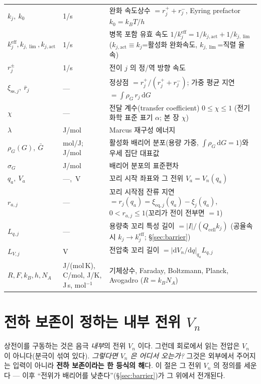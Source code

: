 \documentclass[11pt,a4paper]{article}
\newcommand{\dd}{\mathrm{d}}
\newcommand{\eff}{\mathrm{eff}}
\newcommand{\eq}{\mathrm{eq}}
\newcommand{\cell}{\mathrm{cell}}
\newcommand{\sstat}{\mathrm{ss}}
\begin{document}
\begin{longtable}{p{} p{} p{}}
$k_j,\ k_0$ & 1/s & 완화 속도상수 $=r_j^++r_j^-$, Eyring prefactor $k_0=k_BT/h$ \\
$k_j^{\eff},k_{j,\lim},k_{j,\mathrm{act}}$ & 1/s & 병목 포함 유효 속도 $1/k_j^{\eff}=1/k_{j,\mathrm{act}}+1/k_{j,\lim}$ ($k_{j,\mathrm{act}}\!\equiv\!k_j$=활성화 완화속도, $k_{j,\lim}$=직렬 율속) \\
$r_j^\pm$ & 1/s & 전이 $j$ 의 정/역 방향 속도 \\
$\xi_{\sstat,j},\ \bar r_j$ & --- & 정상점 $=r_j^+/(r_j^++r_j^-)$; 가중 평균 지연 $=\int\rho_G\,r_j\,\dd G$ \\
$\chi$ & --- & 전달 계수(transfer coefficient) $0\le\chi\le1$ (전기화학 표준 표기 $\alpha$; 본 장 $\chi$) \\
$\lambda$ & J/mol & Marcus 재구성 에너지 \\
$\rho_G(G),\ \bar G$ & mol/J;\,J/mol & 활성화 배리어 분포(용량 가중, $\int\rho_G\,\dd G=1$)와 우세 집단 대표값 \\
$\sigma_G$ & J/mol & 배리어 분포의 표준편차 \\
$q_a,\ V_a$ & ---,\ V & 꼬리 시작 좌표와 그 전위 $V_a=V_n(q_a)$ \\
$r_{a,j}$ & --- & 꼬리 시작점 잔류 지연 $=r_j(q_a)=\xi_{\eq,j}(q_a)-\xi_j(q_a)$, $0<r_{a,j}\le1$(꼬리가 전이 전부면 $=1$) \\
$L_{q,j}$ & --- & 용량축 꼬리 특성 길이 $=|I|/(Q_\cell k_j)$ (공율속 시 $k_j\!\to\!k_j^{\eff}$; \S\ref{sec:barrier}) \\
$L_{V,j}$ & V & 전압축 꼬리 길이 $=|\dd V_n/\dd q|_{q_a}L_{q,j}$ \\
$R,F,k_B,h,N_A$ & {\footnotesize J/(mol\,K), C/mol, J/K, J\,s, mol$^{-1}$} & 기체상수, Faraday, Boltzmann, Planck, Avogadro ($R=k_BN_A$) \\
\bottomrule
\end{longtable}

\section{전하 보존이 정하는 내부 전위 $V_n$}\label{sec:stage}
상전이를 구동하는 것은 음극 \emph{내부}의 전위 $V_n$ 이다. 그런데 회로에서 읽는 전압은
$V_n$ 이 아니다(분극이 섞여 있다). \emph{그렇다면 $V_n$ 은 어디서 오는가?} 그것은 외부에서 주어지는 입력이 아니라
\textbf{전하 보존이라는 한 등식의 해}다. 이 절은 그 전위 $V_n$ 의 정의를 세운다 — 이후 ``전위가 배리어를
낮춘다''(\S\ref{sec:barrier})가 그 위에서 전개된다.
\end{document}
